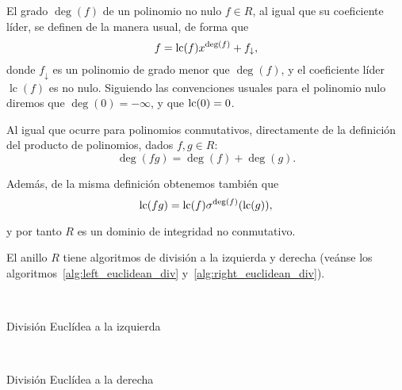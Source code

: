 El grado \(\deg (f)\) de un polinomio no nulo \(f \in R\), al igual que su coeficiente líder, se definen de la manera usual, de forma que
\[
f = \operatorname{lc}(f)x^{\deg(f)} + f_{\downarrow}
,\]
donde \(f_{\downarrow}\) es un polinomio de grado menor que \(\deg(f)\), y el coeficiente líder  \(\operatorname{lc}(f)\) es no nulo. Siguiendo las convenciones usuales para el polinomio nulo diremos que \(\deg(0) = -\infty\), y que \(\operatorname{lc}(0) = 0\).

Al igual que ocurre para polinomios conmutativos, directamente de la definición del producto de polinomios, dados \(f, g \in R\):
\[
\deg(fg) = \deg(f) + \deg(g)
.\]

Además, de la misma definición obtenemos también que
\[
\operatorname{lc}(fg) = \operatorname{lc}(f)\sigma^{\deg(f)}(\operatorname{lc}(g))
,\]

y por tanto \(R\) es un dominio de integridad no conmutativo.

El anillo \(R\) tiene algoritmos de división a la izquierda y derecha (veánse los algoritmos~\ref{alg:left_euclidean_div} y~\ref{alg:right_euclidean_div}).

\begin{algorithm}[H]
 \label{alg:left_euclidean_div}
  \\
 \caption{División Euclídea a la izquierda}
\end{algorithm}

\begin{algorithm}[H]
 \label{alg:right_euclidean_div}
  \\
 \caption{División Euclídea a la derecha}
\end{algorithm}


